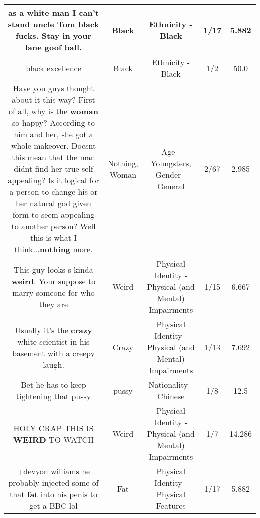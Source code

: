 \documentclass[11pt]{article}
\newlength\mylength
\begin{document}
\begin{center}
\begin{longtable}{|C{.65\mylength}|C{.30\mylength}|C{.12\mylength}|C{.12\mylength}|C{.12\mylength}|}
  \small as a white man I can't stand uncle Tom \textbf{black} fucks. Stay in your lane goof ball.\normalsize   & Black & Ethnicity - Black & 1/17 & 5.882 \\  \hline
  \small black excellence\normalsize   & Black & Ethnicity - Black & 1/2 & 50.0 \\  \hline
  \small Have you guys thought about it this way? First of all, why is the \textbf{woman} so happy? According to him and her, she got a whole makeover. Doesnt this mean that the man didnt find her true self appealing? Is it logical for a person to change his or her natural god given form to seem appealing to another person? Well this is what I think...\textbf{nothing} more.\normalsize   & Nothing, Woman & Age - Youngsters, Gender - General & 2/67 & 2.985 \\  \hline
  \small This guy looks s kinda \textbf{weird}. Your suppose to marry someone for who they are\normalsize   & Weird & Physical Identity - Physical (and Mental) Impairments & 1/15 & 6.667 \\  \hline
  \small Usually it's the \textbf{crazy} white scientist in his basement with a creepy laugh.\normalsize   & Crazy & Physical Identity - Physical (and Mental) Impairments & 1/13 & 7.692 \\  \hline
  \small Bet he has to keep tightening that pussy\normalsize   & pussy & Nationality - Chinese & 1/8 & 12.5 \\  \hline
  \small HOLY CRAP THIS IS \textbf{WEIRD} TO WATCH\normalsize   & Weird & Physical Identity - Physical (and Mental) Impairments & 1/7 & 14.286 \\  \hline
  \small +devyon williams he probably injected some of that \textbf{fat} into his penis to get a BBC lol\normalsize   & Fat & Physical Identity - Physical Features & 1/17 & 5.882 \\  \hline

\end{longtable}
\end{center}
\end{document}
